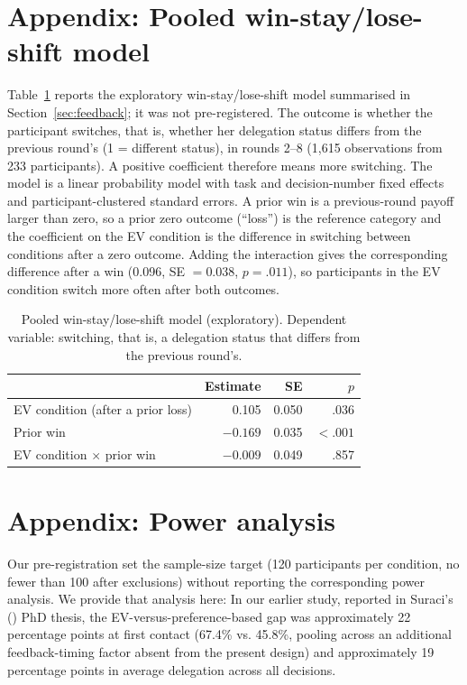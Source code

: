 \documentclass[a4paper, 12pt, fleqn]{article}
\theoremstyle{hypstyle}
\begin{document}




\section{Appendix: Pooled win-stay/lose-shift model}
\label{sec:appendix_wsls}
Table~\ref{tab:appendix_wsls} reports the exploratory win-stay/lose-shift model summarised in Section~\ref{sec:feedback}; it was not pre-registered. The outcome is whether the participant switches, that is, whether her delegation status differs from the previous round's (1 = different status), in rounds 2--8 (1,615 observations from 233 participants). A positive coefficient therefore means more switching. The model is a linear probability model with task and decision-number fixed effects and participant-clustered standard errors. A prior win is a previous-round payoff larger than zero, so a prior zero outcome (``loss'') is the reference category and the coefficient on the EV condition is the difference in switching between conditions after a zero outcome. Adding the interaction gives the corresponding difference after a win (0.096, SE $= 0.038$, $p = .011$), so participants in the EV condition switch more often after both outcomes.


\begin{table}[htbp]
\centering
\caption{Pooled win-stay/lose-shift model (exploratory). Dependent variable: switching, that is, a delegation status that differs from the previous round's.}
\label{tab:appendix_wsls}
\footnotesize
\begin{tabular}{lrrr}
\toprule
 & Estimate & SE & $p$ \\
\midrule
EV condition (after a prior loss) & 0.105 & 0.050 & .036 \\
Prior win & $-0.169$ & 0.035 & $<.001$ \\
EV condition $\times$ prior win & $-0.009$ & 0.049 & .857 \\
\bottomrule
\end{tabular}
\end{table}


\section{Appendix: Power analysis}
\label{sec:appendix_power}
Our pre-registration set the sample-size target (120 participants per condition, no fewer than 100 after exclusions) without reporting the corresponding power analysis. We provide that analysis here: In our earlier study, reported in Suraci's (\citeyear{suraci_2024}) PhD thesis, the EV-versus-preference-based gap was approximately 22 percentage points at first contact (67.4\% vs. 45.8\%, pooling across an additional feedback-timing factor absent from the present design) and approximately 19 percentage points in average delegation across all decisions. 
\end{document}
